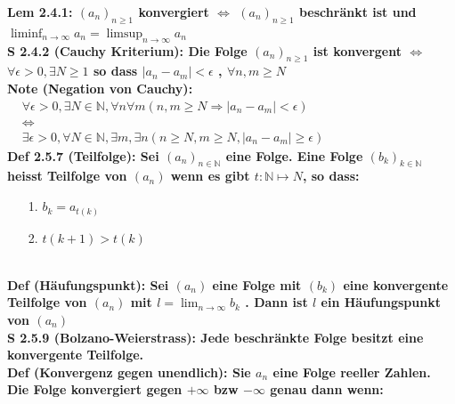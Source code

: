 \documentclass[7pt,landscape, margin = 0.1mm]{article}
\newcommand{\DEF}[2]{\color{chaptercolor}\bf{Def #1}:\color{black}    \hspace{0.2cm} #2 \\}
\newcommand{\NOTE}[2]{\color{chaptercolor}\bf{Note #1}:\color{black}    \hspace{0.2cm} #2 \\}
\newcommand{\LEM}[2]{\color{chaptercolor}\bf{Lem #1}:\color{black}    \hspace{0.2cm} #2 \\}
\newcommand{\SA}[2]{\color{chaptercolor}\bf{S #1}:\color{black}    \hspace{0.2cm} #2 \\}
\begin{document}
\begin{multicols}{4}
\begin{flushleft}
\LEM{2.4.1}{$(a_n)_{n \geq1}$ konvergiert $\Leftrightarrow$ $(a_n)_{n \geq 1}$ beschränkt ist und $\liminf_{n \to \infty} a_n= \limsup_{n \to \infty} a_n$}
\SA{2.4.2 (Cauchy Kriterium)}{ Die Folge $(a_n)_{n \geq 1}$ ist konvergent $\Leftrightarrow$ $\forall \epsilon > 0, \exists N \geq 1$ so dass $|a_n - a_m| < \epsilon$ , $\forall n,m \geq N$}
\NOTE{(Negation von Cauchy)}{$ \begin{aligned} &\forall \epsilon > 0, \exists N \in \mathbb{N}, \forall n \forall m (n,m \geq N \Rightarrow |a_n - a_m|< \epsilon) \\ &\Leftrightarrow \\ &\exists \epsilon > 0, \forall N \in \mathbb{N}, \exists m, \exists n (n \geq N, m \geq N , |a_n - a_m| \geq \epsilon) \end{aligned} $}
\DEF{2.5.7 (Teilfolge)}{ Sei $(a_n)_{n \in \mathbb{N}}$ eine Folge. Eine Folge $(b_k)_{k \in \mathbb{N}}$ heisst Teilfolge von $(a_n)$ wenn es gibt $t: \mathbb{N} \mapsto N$, so dass:
\begin{itemize}
\item[1.] $b_k = a_{t(k)}$
\item[2.] $t(k+1) > t(k)$
\end{itemize}
 }
\DEF{(Häufungspunkt)}{Sei $(a_n)$ eine Folge mit $(b_k)$ eine konvergente Teilfolge von $(a_n)$ mit $l = \lim_{n \to \infty} b_k$ . Dann ist $l$ ein Häufungspunkt von $(a_n)$ }
\SA{2.5.9 (Bolzano-Weierstrass)}{Jede beschränkte Folge besitzt eine konvergente Teilfolge.}
\DEF{(Konvergenz gegen unendlich)}{Sie $a_n$ eine Folge reeller Zahlen. Die Folge konvergiert gegen $+ \infty$ bzw $- \infty$ genau dann wenn:
\begin{itemize}



\end{itemize}}
\end{flushleft}
\end{multicols}
\end{document}
